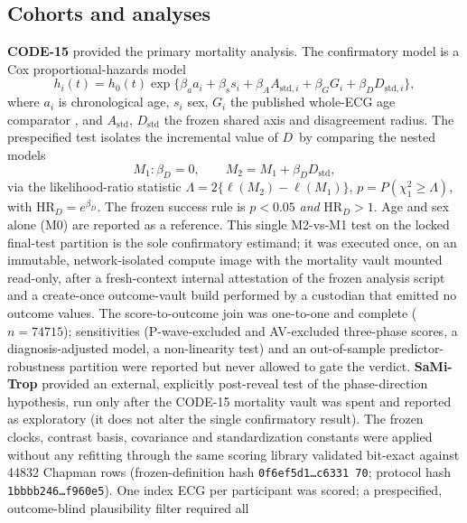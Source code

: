 \documentclass[11pt]{article}
\newcommand{\D}{\ensuremath{D}}
\newcommand{\A}{\ensuremath{A}}
\begin{document}
\subsection{Cohorts and analyses}
\textbf{CODE-15} \citep{code15} provided the primary mortality analysis. The confirmatory
model is a Cox proportional-hazards model
\begin{equation}
h_i(t)=h_0(t)\exp\bigl\{\beta_a a_i+\beta_s s_i+\beta_A \A_{\text{std},i}+\beta_G G_i+\beta_D \D_{\text{std},i}\bigr\},
\label{eq:cox}
\end{equation}
where $a_i$ is chronological age, $s_i$ sex, $G_i$ the published whole-ECG age comparator
\citep{lima2021}, and $\A_{\text{std}}$, $\D_{\text{std}}$ the frozen shared axis and
disagreement radius. The prespecified test isolates the incremental value of \D\ by
comparing the nested models
\begin{equation}
M_1:\beta_D=0,\qquad M_2=M_1+\beta_D \D_{\text{std}},
\end{equation}
via the likelihood-ratio statistic
$\Lambda=2\{\ell(M_2)-\ell(M_1)\}$, $p=P(\chi^2_1\ge\Lambda)$, with
$\mathrm{HR}_D=e^{\beta_D}$. The frozen success rule is $p<0.05$ \emph{and}
$\mathrm{HR}_D>1$. Age and sex alone (M0) are reported as a reference. This single
M2-vs-M1 test on the locked final-test partition is the sole confirmatory estimand; it
was executed once, on an immutable, network-isolated compute image with the mortality
vault mounted read-only, after a fresh-context internal attestation of the frozen
analysis script and a create-once outcome-vault build performed by a custodian that
emitted no outcome values. The score-to-outcome join was one-to-one and complete
($n=\num{74715}$); sensitivities (P-wave-excluded and AV-excluded three-phase scores,
a diagnosis-adjusted model, a non-linearity test) and an out-of-sample predictor-robustness
partition were reported but never allowed to gate the verdict.
\textbf{SaMi-Trop} \citep{cardoso2016samitrop,samitrop2021data} provided an external,
explicitly post-reveal test of the phase-direction hypothesis, run only after the CODE-15
mortality vault was spent and reported as exploratory (it does not alter the single
confirmatory result). The frozen clocks, contrast basis, covariance and standardization
constants were applied without any refitting through the same scoring library validated
bit-exact against \num{44832} Chapman rows (frozen-definition hash
\texttt{0f6ef5d1\dots c6331 70}; protocol hash \texttt{1bbbb246\dots f960e5}). One index ECG
per participant was scored; a prespecified, outcome-blind plausibility filter required all
\end{document}
